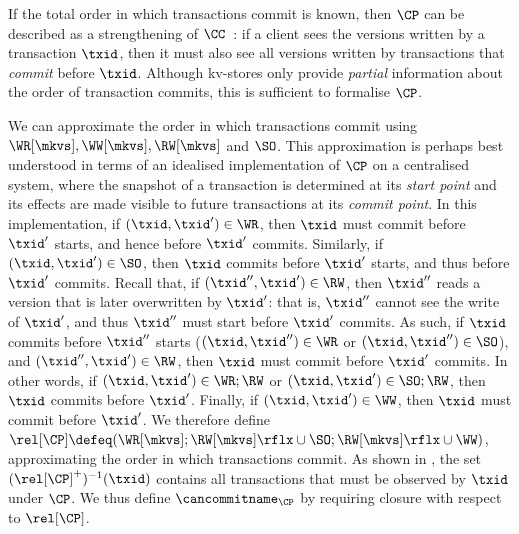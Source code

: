 
\label{para:cp}
If the total order in which transactions commit is known, then \(\CP\)
can be described as a strengthening of \(\CC\)~\cite{laws}: 
if a client sees the versions written by a transaction \(\txid\),
then it must also see all versions written by transactions that \emph{commit} before \(\txid\). 
Although kv-stores only provide \emph{partial} information about the
order of  transaction commits, 
this is sufficient to formalise $\CP$.

We can approximate the order in which transactions 
commit using \(\WR[\mkvs], \allowbreak \WW[\mkvs], \allowbreak \RW[\mkvs]\) and \(\SO\). 
This approximation is perhaps best understood in terms of an idealised implementation of \(\CP\) on a centralised system,
where the snapshot of a transaction is determined at its \emph{start point} and its effects are made visible to future transactions at its \emph{commit point}.
In this implementation, if \((\txid,\txid') \in \WR\), then 
\(\txid\) must commit before \(\txid'\) starts, and hence before \(\txid'\) commits.
Similarly, if \((\txid,\txid') \in \SO\), then \(\txid\) commits before \(\txid'\) starts, 
and thus before \(\txid'\) commits.
Recall that, if \((\txid'', \txid') \in \RW\),
then \(\txid''\) reads a version that is later overwritten by
\(\txid'\):
that is, \(\txid''\) cannot see the write of \(\txid'\), and thus \(\txid''\) must start before 
\(\txid'\) commits. 
As such, if \(\txid\) commits before \(\txid''\) starts 
(\((\txid, \txid'') \in \WR\) or \((\txid,\txid'') \in \SO\)), 
and \((\txid'', \txid') \in \RW\), then \(\txid\) must commit before 
\(\txid'\) commits. 
In other words, if \((\txid,\txid') \in \WR;\RW\) or \((\txid,\txid') \in \SO;\RW\), then \(\txid\) commits before \(\txid'\).
Finally, if \((\txid,\txid') \in\WW\), then \(\txid\) must commit before \(\txid'\). 
We therefore define \(\rel[\CP] \defeq (\WR[\mkvs]; \RW[\mkvs]\rflx \cup \SO;  \RW[\mkvs]\rflx \cup \WW)\), approximating the order in which transactions commit. 
%
As shown in \citet{laws}, the set \((\rel[\CP]^{+})^{-1}(\txid)\) contains all transactions that must be observed by \(\txid\) under \(\CP\). 
We thus define \(\cancommitname_{\CP}\) by requiring closure with
respect to \(\rel[\CP]\).

